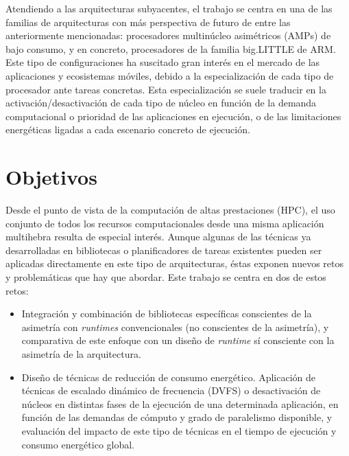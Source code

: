 Atendiendo a las arquitecturas subyacentes, el trabajo se centra en una de
las familias de arquitecturas con más perspectiva de futuro de entre las
anteriormente mencionadas: procesadores multinúcleo asimétricos (AMPs) de
bajo consumo, y en concreto, procesadores de la familia big.LITTLE de ARM.
Este tipo de configuraciones ha suscitado gran interés en el mercado de las
aplicaciones y ecosistemas móviles, debido a la especialización de cada
tipo de procesador ante tareas concretas. Esta especialización se suele
traducir en la activación/desactivación de cada tipo de núcleo en función
de la demanda computacional o prioridad de las aplicaciones en ejecución, o
de las limitaciones energéticas ligadas a cada escenario concreto de
ejecución.


\section{Objetivos}
Desde el punto de vista de la computación de altas prestaciones (HPC), el
uso conjunto de todos los recursos computacionales desde una misma
aplicación multihebra resulta de especial interés. Aunque algunas de las
técnicas ya desarrolladas en bibliotecas o planificadores de tareas
existentes pueden ser aplicadas directamente en este tipo de arquitecturas,
éstas exponen nuevos retos y problemáticas que hay que abordar. Este
trabajo se centra en dos de estos retos:
\begin{itemize}
\item Integración y combinación de bibliotecas específicas conscientes de
  la asimetría con \emph{runtimes} convencionales (no conscientes de la
  asimetría), y comparativa de este enfoque con un diseño de \emph{runtime}
  sí consciente con la asimetría de la arquitectura.

\item Diseño de técnicas de reducción de consumo energético. Aplicación de
  técnicas de escalado dinámico de frecuencia (DVFS) o desactivación de
  núcleos en distintas fases de la ejecución de una determinada aplicación,
  en función de las demandas de cómputo y grado de paralelismo disponible, y
  evaluación del impacto de este tipo de técnicas en el tiempo de ejecución
  y consumo energético global.
\end{itemize}


